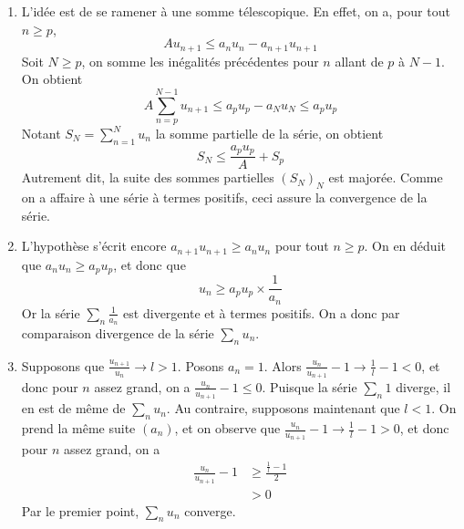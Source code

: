 \begin{enumerate}
    \item  L'idée est de se ramener à une somme télescopique. En effet, on a, pour tout $n\geqslant p$, 
        \[
            Au_{n+1}\leqslant a_n u_n-a_{n+1}u_{n+1}
        \]
        Soit $N\geqslant p$, on somme les inégalités précédentes pour $n$ allant de $p$ à $N-1$. On obtient
        \[
            A\sum\limits_{n=p}^{N-1}u_{n+1}\leqslant a_pu_p-a_Nu_N\leqslant a_pu_p
        \]
Notant $S_N=\sum\limits_{n=1}^N u_n$ la somme partielle de la série, on obtient
        \[
            S_N \leqslant \frac{a_p u_p}A+S_p
        \]
        Autrement dit, la suite des sommes partielles $(S_N)_N$ est majorée. Comme on a affaire à une série à termes positifs, ceci assure la convergence de la série.
        
    \item L'hypothèse s'écrit encore $a_{n+1}u_{n+1}\geqslant a_nu_n$ pour tout $n\geqslant p$. On en déduit que $a_nu_n\geqslant a_pu_p$, et donc que
        \[
            u_n\geqslant a_p u_p\times\frac{1}{a_n}
        \]
        Or la série $\sum\limits_n \frac 1{a_n}$ est divergente et à termes positifs. On a donc par comparaison divergence de la série $\sum\limits_n u_n$.
        
    \item Supposons que $\frac{u_{n+1}}{u_n}\to l>1$. Posons $a_n=1$. Alors $\frac{u_n}{u_{n+1}}-1\to\frac{ 1}{l}-1<0$, et donc pour $n$ assez grand, on a $\frac{u_n}{u_{n+1}}-1\leqslant 0$. Puisque la série $\sum\limits_n 1$ diverge, il en est de même de $\sum\limits_n u_n$. Au contraire, supposons maintenant que $l<1$. On prend la même suite $(a_n)$, et on observe que  $\frac{u_n}{u_{n+1}}-1\to\frac 1l-1>0$, et donc pour $n$ assez grand,
on a 
    \[
        \begin{aligned}
            \frac{u_n}{u_{n+1}}-1&\geqslant \frac{\frac{1}{l}-1}2\\
            &>0
        \end{aligned}
    \]
    Par le premier point, $\sum\limits_n u_n$ converge. 


\end{enumerate}
